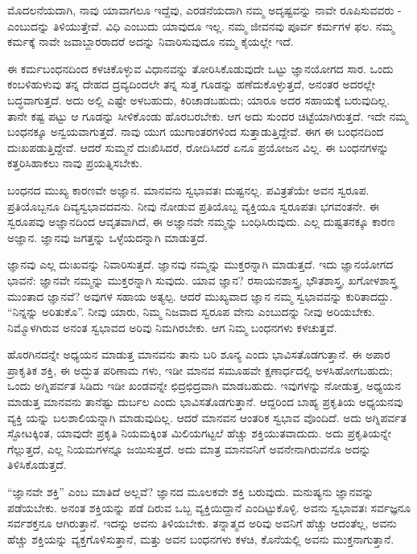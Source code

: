 ಮೊದಲನೆಯದಾಗಿ, ನಾವು ಯಾವಾಗಲೂ ಇದ್ದೆವು, ಎರಡನೆಯದಾಗಿ ನಮ್ಮ ಅದೃಷ್ಟವನ್ನು ನಾವೇ ರೂಪಿಸುವವರು - ಎಂಬುದನ್ನು ತಿಳಿಯುತ್ತೇವೆ. ವಿಧಿ ಎಂಬುದು ಯಾವುದೂ ಇಲ್ಲ. ನಮ್ಮ ಜೀವನವು ಪೂರ್ವ ಕರ್ಮಗಳ ಫಲ. ನಮ್ಮ ಕರ್ಮಕ್ಕೆ ನಾವೇ ಜವಾಬ್ದಾರರಾದರೆ ಅದನ್ನು ನಿವಾರಿಸುವುದೂ ನಮ್ಮ ಕೈಯಲ್ಲೇ ಇದೆ.

ಈ ಕರ್ಮಬಂಧನದಿಂದ ಕಳಚಿಕೊಳ್ಳುವ ವಿಧಾನವನ್ನು ತೋರಿಸಿಕೊಡುವುದೇ ಒಟ್ಟು ಜ್ಞಾನಯೋಗದ ಸಾರ. ಒಂದು ಕಂಬಳಿಹುಳುವು ತನ್ನ ದೇಹದ ದ್ರವ್ಯದಿಂದಲೇ ತನ್ನ ಸುತ್ತ ಗೂಡನ್ನು ಹಣೆದುಕೊಳ್ಳುತ್ತದೆ, ಅನಂತರ ಅದರಲ್ಲೇ ಬದ್ಧವಾಗುತ್ತದೆ. ಅದು ಅಲ್ಲಿ ಎಷ್ಟೇ ಅಳಬಹುದು, ಕಿರಿಚಾಡಬಹುದು; ಯಾರೂ ಅದರ ಸಹಾಯಕ್ಕೆ ಬರುವುದಿಲ್ಲ. ತಾನೇ ಕಷ್ಟ ಪಟ್ಟು ಆ ಗೂಡನ್ನು ಸೀಳಿಕೊಂಡು ಹೊರಬರಬೇಕು. ಆಗ ಅದು ಸುಂದರ ಚಿಟ್ಟೆಯಾಗಿರುತ್ತದೆ. ಇದೇ ನಮ್ಮ ಬಂಧನಕ್ಕೂ ಅನ್ವಯವಾಗುತ್ತದೆ. ನಾವು ಯುಗ ಯುಗಾಂತರಗಳಿಂದ ಸುತ್ತಾಡುತ್ತಿದ್ದೇವೆ. ಈಗ ಈ ಬಂಧನದಿಂದ ದುಃಖಪಡುತ್ತಿದ್ದೇವೆ. ಆದರೆ ಸುಮ್ಮನೆ ದುಃಖಿಸಿದರೆ, ರೋದಿಸಿದರೆ ಏನೂ ಪ್ರಯೋಜನ ವಿಲ್ಲ. ಈ ಬಂಧನಗಳನ್ನು ಕತ್ತರಿಸಿಹಾಕಲು ನಾವು ಪ್ರಯತ್ನಿಸಬೇಕು.

ಬಂಧನದ ಮುಖ್ಯ ಕಾರಣವೇ ಅಜ್ಞಾನ. ಮಾನವನು ಸ್ವಭಾವತಃ ದುಷ್ಟನಲ್ಲ. ಪವಿತ್ರತೆಯೇ ಅವನ ಸ್ವರೂಪ. ಪ್ರತಿಯೊಬ್ಬನೂ ದಿವ್ಯಸ್ವಭಾವದವನು. ನೀವು ನೋಡುವ ಪ್ರತಿಯೊಬ್ಬ ವ್ಯಕ್ತಿಯೂ ಸ್ವರೂಪತಃ ಭಗವಂತನೇ. ಈ ಸ್ವರೂಪವು ಅಜ್ಞಾನದಿಂದ ಆವೃತವಾಗಿದೆ, ಈ ಅಜ್ಞಾನವೇ ನಮ್ಮನ್ನು ಬಂಧಿಸಿರುವುದು. ಎಲ್ಲ ದುಷ್ಟತನಕ್ಕೂ ಕಾರಣ ಅಜ್ಞಾನ. ಜ್ಞಾನವು ಜಗತ್ತನ್ನು ಒಳ್ಳೆಯದನ್ನಾಗಿ ಮಾಡುತ್ತದೆ.

ಜ್ಞಾನವು ಎಲ್ಲ ದುಃಖವನ್ನು ನಿವಾರಿಸುತ್ತದೆ. ಜ್ಞಾನವು ನಮ್ಮನ್ನು ಮುಕ್ತರನ್ನಾಗಿ ಮಾಡುತ್ತದೆ. ಇದು ಜ್ಞಾನಯೋಗದ ಭಾವನೆ: ಜ್ಞಾನವೇ ನಮ್ಮನ್ನು ಮುಕ್ತರನ್ನಾಗಿ ಸುವುದು. ಯಾವ ಜ್ಞಾನ? ರಸಾಯನಶಾಸ್ತ್ರ, ಭೌತಶಾಸ್ತ್ರ, ಖಗೋಳಶಾಸ್ತ್ರ ಮುಂತಾದ ಜ್ಞಾನವೆ? ಅವುಗಳ ಸಹಾಯ ಅತ್ಯಲ್ಪ. ಆದರೆ ಮುಖ್ಯವಾದ ಜ್ಞಾನ ನಮ್ಮ ಸ್ವಭಾವವನ್ನು ಕುರಿತಾದದ್ದು. “ನಿನ್ನನ್ನು ಅರಿತುಕೊ”. ನೀವು ಯಾರು, ನಿಮ್ಮ ನಿಜವಾದ ಸ್ವರೂಪ ವೇನು ಎಂಬುದನ್ನು ನೀವು ಅರಿಯಬೇಕು. ನಿಮ್ಮೊಳಗಿರುವ ಅನಂತ ಸ್ವಭಾವದ ಅರಿವು ನಿಮಗಿರಬೇಕು. ಆಗ ನಿಮ್ಮ ಬಂಧನಗಳು ಕಳಚುತ್ತವೆ.

ಹೊರಗಿನದನ್ನೇ ಅಧ್ಯಯನ ಮಾಡುತ್ತ ಮಾನವನು ತಾನು ಬರಿ ಶೂನ್ಯ ಎಂದು ಭಾವಿಸತೊಡಗುತ್ತಾನೆ. ಈ ಅಪಾರ ಪ್ರಾಕೃತಿಕ ಶಕ್ತಿ, ಈ ಅದ್ಭುತ ಪರಿಣಾಮ ಗಳು, ಇಡೀ ಮಾನವ ಸಮೂಹವೇ ಕ್ಷಣಾರ್ಧದಲ್ಲಿ ಅಳಸಿಹೋಗಬಹುದು; ಒಂದು ಅಗ್ನಿಪರ್ವತ ಸಿಡಿದು ಇಡೀ ಖಂಡವನ್ನೇ ಛಿದ್ರಛಿದ್ರವಾಗಿ ಮಾಡಬಹುದು. ಇವುಗಳನ್ನು ನೋಡುತ್ತ, ಅಧ್ಯಯನ ಮಾಡುತ್ತ ಮಾನವನು ತಾನೆಷ್ಟು ದುರ್ಬಲ ಎಂದು ಭಾವಿಸತೊಡಗುತ್ತಾನೆ. ಆದ್ದರಿಂದ ಬಾಹ್ಯ ಪ್ರಕೃತಿಯ ಅಧ್ಯಯನವು ವ್ಯಕ್ತಿ ಯನ್ನು ಬಲಶಾಲಿಯನ್ನಾಗಿ ಮಾಡುವುದಿಲ್ಲ. ಆದರೆ ಮಾನವನ ಆಂತರಿಕ ಸ್ವಭಾವ ವೊಂದಿದೆ. ಅದು ಅಗ್ನಿಪರ್ವತ ಸ್ಫೋಟಕ್ಕಿಂತ, ಯಾವುದೇ ಪ್ರಕೃತಿ ನಿಯಮಕ್ಕಿಂತ ಮಿಲಿಯಗಟ್ಟಲೆ ಹೆಚ್ಚು ಶಕ್ತಿಯುತವಾದುದು. ಅದು ಪ್ರಕೃತಿಯನ್ನೇ ಗೆಲ್ಲುತ್ತದೆ, ಎಲ್ಲ ನಿಯಮಗಳನ್ನೂ ಜಯಿಸುತ್ತದೆ. ಅದು ಮಾತ್ರ ಮಾನವನಿಗೆ ಅವನೇನಾಗಿರುವನೊ ಅದನ್ನು ತಿಳಿಸಿಕೊಡುತ್ತದೆ.

“ಜ್ಞಾನವೇ ಶಕ್ತಿ” ಎಂಬ ಮಾತಿದೆ ಅಲ್ಲವೆ? ಜ್ಞಾನದ ಮೂಲಕವೇ ಶಕ್ತಿ ಬರುವುದು. ಮನುಷ್ಯನು ಜ್ಞಾನವನ್ನು ಪಡೆಯಬೇಕು. ಅನಂತ ಶಕ್ತಿಯನ್ನು ಪಡೆ ದಿರುವ ಒಬ್ಬ ವ್ಯಕ್ತಿಯಿದ್ದಾನೆ ಎಂದಿಟ್ಟುಕೊಳ್ಳಿ. ಅವನು ಸ್ವಭಾವತಃ ಸರ್ವಜ್ಞನೂ ಸರ್ವಶಕ್ತನೂ ಆಗಿರುತ್ತಾನೆ. ಇದನ್ನು ಅವನು ತಿಳಿಯಬೇಕು. ತನ್ನಾತ್ಮದ ಅರಿವು ಅವನಿಗೆ ಹೆಚ್ಚು ಆದಂತೆಲ್ಲ, ಅವನು ಹೆಚ್ಚು ಶಕ್ತಿಯನ್ನು ವ್ಯಕ್ತಗೊಳಿಸುತ್ತಾನೆ, ಮತ್ತು ಅವನ ಬಂಧನಗಳು ಕಳಚಿ, ಕೊನೆಯಲ್ಲಿ ಅವನು ಮುಕ್ತನಾಗುತ್ತಾನೆ.

